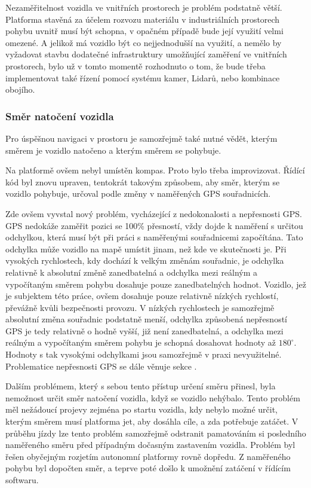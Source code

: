 \documentclass[czech,bachelor,dept460,male,cpp,cpdeclaration]{diploma}
\begin{document}
Nezaměřitelnost vozidla ve vnitřních prostorech je problém podstatně větší. Platforma stavěná za účelem rozvozu materiálu 
v industriálních prostorech pohybu uvnitř musí být schopna, v opačném případě bude její využití velmi omezené. A jelikož má
vozidlo být co nejjednodušší na využití, a nemělo by vyžadovat stavbu dodatečné infrastruktury umožňující zaměření ve vnitřních
prostorech, bylo už v tomto momentě rozhodnuto o tom, že bude třeba implementovat také řízení pomocí systému kamer, Lidarů, nebo
kombinace obojího.

\subsubsection{Směr natočení vozidla} \label{directions-and-angles}

Pro úspěšnou navigaci v prostoru je samozřejmě také nutné vědět, kterým směrem je vozidlo natočeno a kterým směrem se pohybuje.

Na platformě ovšem nebyl umístěn kompas. Proto bylo třeba improvizovat. Řídící kód byl znovu upraven, tentokrát takovým způsobem,
aby směr, kterým se vozidlo pohybuje, určoval podle změny v naměřených GPS souřadnicích. 

Zde ovšem vyvstal nový problém, vycházející z nedokonalosti a nepřesnosti GPS. GPS nedokáže zaměřit pozici se 100\% přesností, 
vždy dojde k naměření s určitou odchylkou, která musí být při práci s naměřenými souřadnicemi započítána. Tato odchylka může 
vozidlo na mapě umístit jinam, než kde ve skutečnosti je. Při vysokých rychlostech, kdy dochází k velkým změnám souřadnic, 
je odchylka relativně k absolutní změně zanedbatelná a odchylka mezi reálným a vypočítaným směrem pohybu dosahuje pouze 
zanedbatelných hodnot. Vozidlo, jež je subjektem této práce, ovšem dosahuje pouze relativně nízkých rychlostí, převážně kvůli 
bezpečnosti provozu. V nízkých rychlostech je samozřejmě absolutní změna souřadnic podstatně menší, odchylka způsobená nepřesností
GPS je tedy relativně o hodně vyšší, již není zanedbatelná, a odchylka mezi reálným a vypočítaným směrem pohybu je schopná 
dosahovat hodnoty až $180^{\circ}$. Hodnoty s tak vysokými odchylkami jsou samozřejmě v praxi nevyužitelné. Problematice 
nepřesnosti GPS se dále věnuje sekce . 

Dalším problémem, který s sebou tento přístup určení směru přinesl, byla nemožnost určit směr natočení vozidla, když se vozidlo 
nehýbalo. Tento problém měl nežádoucí projevy zejména po startu vozidla, kdy nebylo možné určit, kterým směrem musí platforma jet,
aby dosáhla cíle, a zda potřebuje zatáčet. V průběhu jízdy lze tento problém samozřejmě odstranit pamatováním si posledního 
naměřeného směru před případným dočasným zastavením vozidla. Problém byl řešen obyčejným rozjetím autonomní platformy rovně 
dopředu. Z naměřeného pohybu byl dopočten směr, a teprve poté došlo k umožnění zatáčení v řídícím softwaru.
\end{document}
